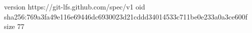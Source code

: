 version https://git-lfs.github.com/spec/v1
oid sha256:769a3fa49e116e69446dc6930023d21cddd34014533c711be0e233a0a3ce600f
size 77
